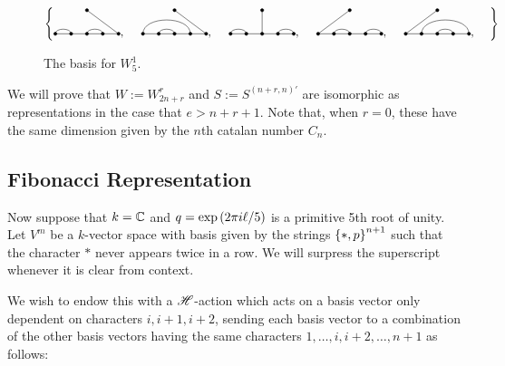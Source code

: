 \documentclass{amsart}
\begin{document}
\begin{figure} 
  \def\cbasisspacing{5mm}
  $\cbr{
    \begin{gathered}
      \GeneralizedMatching{5}{1/2, 3/4}{1}{5/1}{3/4}, \hspace{\cbasisspacing}
      \GeneralizedMatching{5}{1/4, 2/3}{1}{5/1}{3/4}, \hspace{\cbasisspacing}
      \GeneralizedMatching{5}{1/2, 4/5}{1}{3/1}{3/4}, \hspace{\cbasisspacing}
      \GeneralizedMatching{5}{2/3, 4/5}{1}{1/1}{3/4}, \hspace{\cbasisspacing}
      \GeneralizedMatching{5}{2/5, 3/4}{1}{1/1}{3/4}, \hspace{\cbasisspacing}
     \end{gathered}}$ 
    \caption{The basis for $W_5^1$.}
  \label{S5 Basis}
\end{figure} 

We will prove that $W := W_{2n+r}^r$ and $S := S^{(n+r,n)'}$ are isomorphic as representations in the case that $e > n + r + 1$.
Note that, when $r = 0$, these have the same dimension given by the $n$th catalan number $C_n$.
 
\subsection{Fibonacci Representation}
Now suppose that $k = \mathbb{C}$ and $q = \exp\left( 2 \pi i \ell/5 \right)$ is a primitive 5th root of unity.
Let $V^m$ be a $k$-vector space with basis given by the strings $\left\{ *,p \right\}^{n+1}$ such that the character $*$ never appears twice in a row. 
We will surpress the superscript whenever it is clear from context.

We wish to endow this with a $\mathscr{H}$-action which acts on a basis vector only dependent on characters $i,i+1,i+2$, sending each basis vector to a combination of the other basis vectors having the same characters $1,\dots,i,i+2,\dots,n+1$ as follows:
\def\vara{\alpha}
\def\varb{\beta}
\def\varc{\gamma}
\def\vard{\delta}
\def\vare{\varepsilon}
\end{document}
